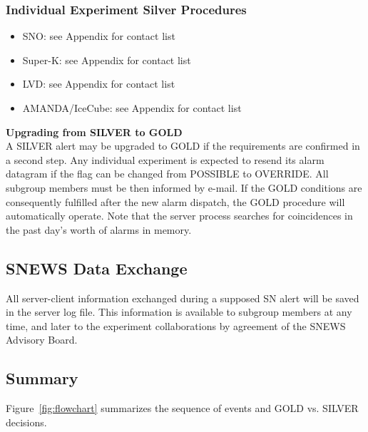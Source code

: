\documentclass{article}
\begin{document}
\subsubsection{Individual Experiment Silver Procedures}

\begin{itemize}

\item SNO: see Appendix for contact list
\item Super-K: see Appendix for contact list
\item LVD: see Appendix for contact list
\item AMANDA/IceCube: see Appendix for contact list

\end{itemize}


\noindent \textbf{Upgrading from SILVER to GOLD}\\
A SILVER alert may be upgraded to GOLD if the requirements are
confirmed in a second step. Any individual experiment is expected to
resend its alarm datagram if the flag can be changed from POSSIBLE to
OVERRIDE. All subgroup members must be then informed by
e-mail. If the GOLD conditions are consequently fulfilled after the
new alarm dispatch, the GOLD procedure will automatically operate.
Note that the server process searches for coincidences
in the past day's worth of alarms in memory.

\subsection{SNEWS Data Exchange}

All server-client information
exchanged during a supposed SN alert will be saved
in the server log file. This information is available to subgroup
members at any time, and later to the experiment collaborations
by agreement of the SNEWS Advisory Board.


\subsection{Summary}

Figure~\ref{fig:flowchart} summarizes the sequence of events 
and GOLD vs. SILVER decisions.
\end{document}
